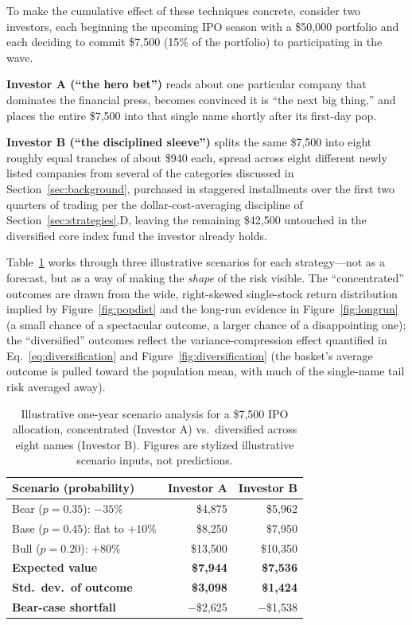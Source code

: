 \documentclass[conference]{IEEEtran}
\begin{document}
To make the cumulative effect of these techniques concrete, consider two investors, each beginning the upcoming IPO season with a \$50,000 portfolio and each deciding to commit \$7,500 (15\% of the portfolio) to participating in the wave.

\textbf{Investor A (``the hero bet'')} reads about one particular company that dominates the financial press, becomes convinced it is ``the next big thing,'' and places the entire \$7,500 into that single name shortly after its first-day pop.

\textbf{Investor B (``the disciplined sleeve'')} splits the same \$7,500 into eight roughly equal tranches of about \$940 each, spread across eight different newly listed companies from several of the categories discussed in Section~\ref{sec:background}, purchased in staggered installments over the first two quarters of trading per the dollar-cost-averaging discipline of Section~\ref{sec:strategies}.D, leaving the remaining \$42,500 untouched in the diversified core index fund the investor already holds.

Table~\ref{tab:scenario} works through three illustrative scenarios for each strategy---not as a forecast, but as a way of making the \emph{shape} of the risk visible. The ``concentrated'' outcomes are drawn from the wide, right-skewed single-stock return distribution implied by Figure~\ref{fig:popdist} and the long-run evidence in Figure~\ref{fig:longrun} (a small chance of a spectacular outcome, a larger chance of a disappointing one); the ``diversified'' outcomes reflect the variance-compression effect quantified in Eq.~\eqref{eq:diversification} and Figure~\ref{fig:diversification} (the basket's average outcome is pulled toward the population mean, with much of the single-name tail risk averaged away).

\begin{table}[!t]
\centering
\caption{Illustrative one-year scenario analysis for a \$7,500 IPO allocation, concentrated (Investor A) vs.\ diversified across eight names (Investor B). Figures are stylized illustrative scenario inputs, not predictions.}
\label{tab:scenario}
\small
\begin{tabular}{@{}p{3.6cm}rr@{}}
\toprule
Scenario (probability) & Investor A & Investor B \\
\midrule
Bear ($p=0.35$): $-35\%$ & \$4{,}875 & \$5{,}962 \\
Base ($p=0.45$): flat to $+10\%$ & \$8{,}250 & \$7{,}950 \\
Bull ($p=0.20$): $+80\%$ & \$13{,}500 & \$10{,}350 \\
\midrule
\textbf{Expected value} & \textbf{\$7{,}944} & \textbf{\$7{,}536} \\
\textbf{Std.\ dev.\ of outcome} & \textbf{\$3{,}098} & \textbf{\$1{,}424} \\
\textbf{Bear-case shortfall} & $-$\$2{,}625 & $-$\$1{,}538 \\
\bottomrule
\end{tabular}
\end{table}
\end{document}

